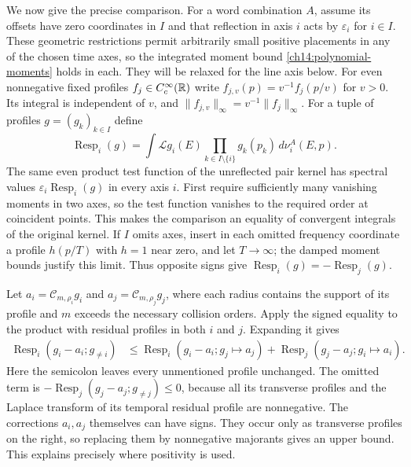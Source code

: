 We now give the precise comparison. For a word combination $A$, assume
its offsets have zero coordinates in $I$ and that reflection in axis $i$
acts by $\varepsilon_i$ for $i\in I$. These geometric restrictions permit
arbitrarily small positive placements in any of the chosen time axes,
so the integrated moment bound \eqref{ch14:polynomial-moments} holds
in each. They will be relaxed for the line axis below.
For even nonnegative fixed profiles $f_j\in C_c^\infty(\mathbb R)$ write
$f_{j,v}(p)=v^{-1}f_j(p/v)$ for $v>0$. Its integral is independent
of $v$, and $\|f_{j,v}\|_\infty=v^{-1}\|f_j\|_\infty$. For a
tuple of profiles $g=(g_k)_{k\in I}$ define
\[
 \operatorname{Resp}_i(g)
   =\int\mathcal Lg_i(E)\prod_{k\in I\setminus\{i\}}g_k(p_k)
                                                     \,d\nu_i^A(E,p).
\]
The same even product test function of the unreflected pair kernel has spectral
values $\varepsilon_i\operatorname{Resp}_i(g)$ in every axis $i$.
First require sufficiently many vanishing moments in two axes, so the
test function vanishes to the required order at coincident points. This makes the
comparison an equality of convergent integrals of the original kernel.
If $I$ omits axes, insert in each omitted frequency coordinate a profile
$h(p/T)$ with $h=1$ near zero, and let $T\to\infty$; the damped moment
bounds justify this limit. Thus opposite signs give
$\operatorname{Resp}_i(g)=-\operatorname{Resp}_j(g)$.

Let $a_i=\mathcal C_{m,\rho_i}g_i$ and
$a_j=\mathcal C_{m,\rho_j}g_j$, where each radius contains the support
of its profile and $m$ exceeds the necessary collision orders.
Apply the signed equality to the product with residual profiles in
both $i$ and $j$. Expanding it gives
\begin{align}
 \operatorname{Resp}_i(g_i-a_i;g_{\ne i})
 &\le \operatorname{Resp}_i(g_i-a_i;g_j\mapsto a_j)
       +\operatorname{Resp}_j(g_j-a_j;g_i\mapsto a_i).
 \label{ch14:sign-transfer}
\end{align}
Here the semicolon leaves every unmentioned profile unchanged.
The omitted term is
$-\operatorname{Resp}_j(g_j-a_j;g_{\ne j})\le0$, because all its transverse profiles and the Laplace transform of its temporal
residual profile are nonnegative.
The corrections $a_i,a_j$ themselves can have signs. They occur only
as transverse profiles on the right, so replacing them by nonnegative
majorants gives an upper bound. This explains precisely where positivity
is used.

